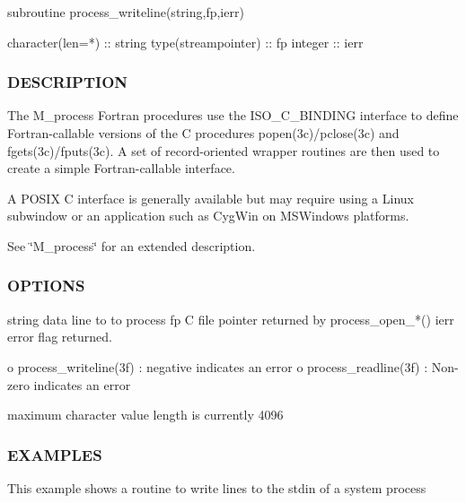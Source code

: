 \begin{DoxyVerb} subroutine process_writeline(string,fp,ierr)

   character(len=*)    :: string
   type(streampointer) :: fp
   integer             :: ierr
\end{DoxyVerb}


\subsubsection*{D\+E\+S\+C\+R\+I\+P\+T\+I\+ON}

The M\+\_\+process Fortran procedures use the I\+S\+O\+\_\+\+C\+\_\+\+B\+I\+N\+D\+I\+NG interface to define Fortran-\/callable versions of the C procedures popen(3c)/pclose(3c) and fgets(3c)/fputs(3c). A set of record-\/oriented wrapper routines are then used to create a simple Fortran-\/callable interface.

A P\+O\+S\+IX C interface is generally available but may require using a Linux subwindow or an application such as Cyg\+Win on M\+S\+Windows platforms.

See \char`\"{}\+M\+\_\+process\char`\"{} for an extended description.

\subsubsection*{O\+P\+T\+I\+O\+NS}

\begin{DoxyVerb}string   data line to to process
fp       C file pointer returned by process_open_*()
ierr     error flag returned.

          o process_writeline(3f) : negative indicates an error
          o process_readline(3f)  : Non-zero indicates an error

maximum character value length is currently 4096
\end{DoxyVerb}


\subsubsection*{E\+X\+A\+M\+P\+L\+ES}

This example shows a routine to write lines to the stdin of a system process

